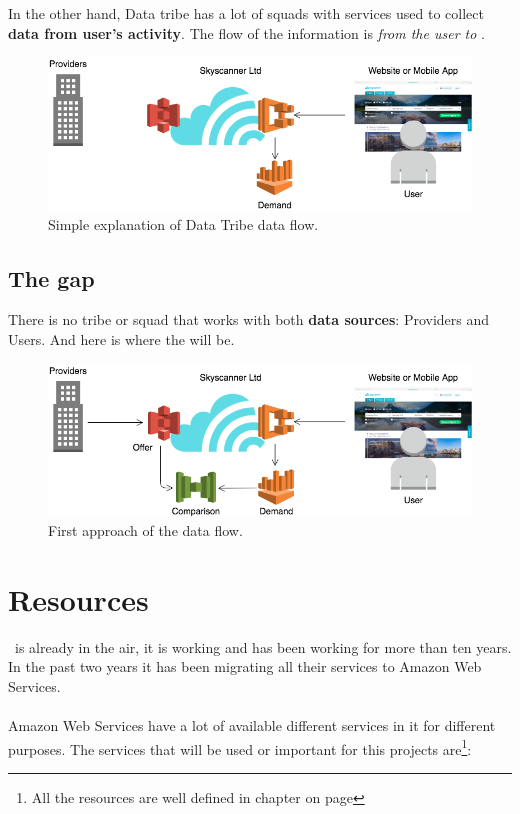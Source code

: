 In the other hand, Data tribe has a lot of squads with services used to collect \textbf{data from user's activity}. The flow of the information is \textit{from the user to \company}.

\begin{figure}[H]
\centering
\includegraphics[scale=0.45]{diagrams/state-of-the-art-tribes-data-tribe.png}
\caption{Simple explanation of Data Tribe data flow.}
\end{figure}

\subsection{The gap}

There is no tribe or squad that works with both \textbf{data sources}: Providers and Users. And here is where the \textit{\thesistitle} will be.

\begin{figure}[H]
\centering
\includegraphics[scale=0.45]{diagrams/state-of-the-art-tribes-comparison.png}
\caption{First approach of the \thesis data flow.}
\end{figure}


\section{Resources} \label{resources}

\company\ is already in the air, it is working and has been working for more than ten years. In the past two years it has been migrating all their services to Amazon Web Services\cite{aws}.
\\\\
Amazon Web Services have a lot of available different services in it for different purposes. The services that will be used or important for this projects are\footnote{All the resources are well defined in chapter  on page \pageref{chapter06}}:

